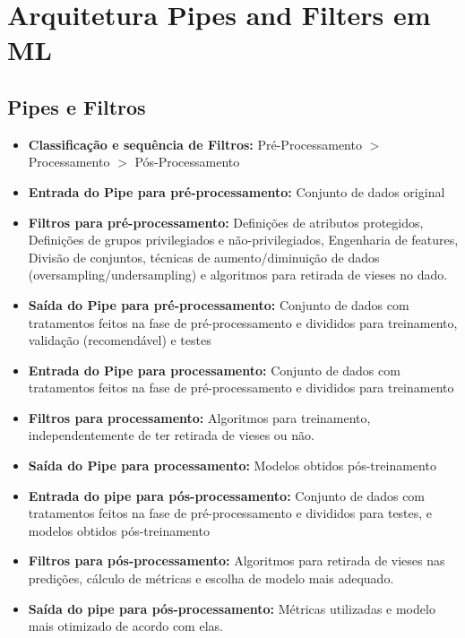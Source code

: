 \documentclass[portugues, 12pt, a4paper]{article}
\begin{document}
\section{Arquitetura Pipes and Filters em ML}

\subsection{Pipes e Filtros}

\begin{itemize}
\item \textbf{Classificação e sequência de Filtros:} Pré-Processamento $>$ Processamento $>$ Pós-Processamento

\item \textbf{Entrada do Pipe para pré-processamento:} Conjunto de dados original

\item \textbf{Filtros para pré-processamento:} Definições de atributos protegidos, Definições de grupos privilegiados e não-privilegiados, Engenharia de features, Divisão de conjuntos, técnicas de aumento/diminuição de dados (oversampling/undersampling) e algoritmos para retirada de vieses no dado.

\item \textbf{Saída do Pipe para pré-processamento:} Conjunto de dados com tratamentos feitos na fase de pré-processamento e divididos para treinamento, validação (recomendável) e testes

\item \textbf{Entrada do Pipe para processamento:} Conjunto de dados com tratamentos feitos na fase de pré-processamento e divididos para treinamento

\item \textbf{Filtros para processamento:} Algoritmos para treinamento, independentemente de ter retirada de vieses ou não.

\item \textbf{Saída do Pipe para processamento:} Modelos obtidos pós-treinamento

\item \textbf{Entrada do pipe para pós-processamento:} Conjunto de dados com tratamentos feitos na fase de pré-processamento e divididos para testes, e modelos obtidos pós-treinamento

\item \textbf{Filtros para pós-processamento:} Algoritmos para retirada de vieses nas predições, cálculo de métricas e escolha de modelo mais adequado.

\item \textbf{Saída do pipe para pós-processamento:} Métricas utilizadas e modelo mais otimizado de acordo com elas.
\end{itemize}
\end{document}
